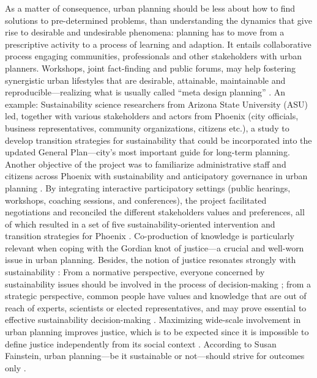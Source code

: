 \documentclass[10pt,a4paper]{article}
\begin{document}
\begin{multicols}{2}
As a matter of consequence, urban planning should be less about how to find solutions to pre-determined problems, than understanding the dynamics that give rise to desirable and undesirable phenomena: planning has to move from a prescriptive activity to a process of learning and adaption. It entails collaborative process engaging communities, professionals and other stakeholders with urban planners. Workshops, joint fact-finding and public forums, may help fostering synergistic urban lifestyles that are desirable, attainable, maintainable and reproducible---realizing what is usually called ``meta design planning'' \citep{r110}. An example: Sustainability science researchers from Arizona State University (ASU) led, together with various stakeholders and actors from Phoenix (city officials, business representatives, community organizations, citizens etc.), a study to develop transition strategies for sustainability that could be incorporated into the updated General Plan---city's most important guide for long-term planning. Another objective of the project was to familiarize administrative staff and citizens across Phoenix with sustainability and anticipatory governance in urban planning \citep{r111}. By integrating interactive participatory settings (public hearings, workshops, coaching sessions, and conferences), the project facilitated negotiations and reconciled the different stakeholders values and preferences, all of which resulted in a set of five sustainability-oriented intervention and transition strategies for Phoenix \citep{r112}. 
Co-production of knowledge is particularly relevant when coping with the Gordian knot of justice---a crucial and well-worn issue in urban planning. Besides, the notion of justice resonates strongly with sustainability \citep{r113}: From a normative perspective, everyone concerned by sustainability issues should be involved in the process of decision-making \citep{r114}; from a strategic perspective, common people have values and knowledge that are out of reach of experts, scientists or elected representatives, and may prove essential to effective sustainability decision-making \citep{r115}. Maximizing wide-scale involvement in urban planning improves justice, which is to be expected since it is impossible to define justice independently from its social context \citep{r116, r117}. According to Susan Fainstein, urban planning---be it sustainable or not---should strive for outcomes only \citep{r118}.


\end{multicols}
\end{document}
